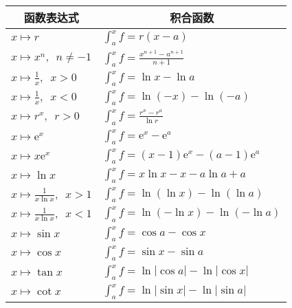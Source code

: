 \documentclass[12pt,UTF8]{ctexbook}
\begin{document}
\begin{appendix}
\begin{center}
    \renewcommand{\arraystretch}{2}
    \setlength{\extrarowheight}{-3pt}
    \begin{longtable}{|l|l|}
        \hline \multicolumn{1}{|c|}{\textbf{函数表达式}} & \multicolumn{1}{c|}{\textbf{积合函数}} \\[4pt] 
        \hline    
        $\displaystyle x\mapsto r$ & $\displaystyle \int_a^x f = r(x - a)$ \\[4pt]
        \hline    
        $\displaystyle x\mapsto x^n,\,\,\,n\neq -1$ & $\displaystyle \int_a^x f = \frac{x^{n+1} - a^{n+1}}{n+1}$ \\[4pt]
        \hline    
        $\displaystyle x\mapsto \frac{1}{x}, \,\,\, x > 0$ & $\displaystyle \int_a^x f = \ln{x} - \ln{a}$ \\[4pt]
        \hline    
        $\displaystyle x\mapsto \frac{1}{x}, \,\,\, x < 0$ & $\displaystyle \int_a^x f = \ln{(-x)} - \ln{(-a)}$ \\[4pt]
        \hline
        $\displaystyle x\mapsto r^x,\,\,\, r>0$ & $\displaystyle \int_a^x f = \frac{r^x - r^a}{\ln{r}}$ \\[4pt]
        \hline
        $\displaystyle x\mapsto \mathrm{e}^x$ & $\displaystyle \int_a^x f = \mathrm{e}^x - \mathrm{e}^a$ \\[4pt]
        \hline    
        $\displaystyle x\mapsto x\mathrm{e}^x$ & $\displaystyle \int_a^x f = (x - 1)\mathrm{e}^x - (a - 1)\mathrm{e}^a$ \\[4pt]
        \hline
        $\displaystyle x\mapsto \ln{x}$ & $\displaystyle \int_a^x f = x\ln{x} - x - a\ln{a} + a$ \\[4pt]
        \hline
        $\displaystyle x\mapsto \frac{1}{x\ln{x}},\,\,\, x>1$ & $\displaystyle \int_a^x f = \ln{(\ln{x})} - \ln{(\ln{a})}$ \\[4pt]
        \hline
        $\displaystyle x\mapsto \frac{1}{x\ln{x}},\,\,\, x<1$ & $\displaystyle \int_a^x f = \ln{(-\ln{x})} - \ln{(-\ln{a})}$ \\[4pt]
        \hline    
        $\displaystyle x\mapsto \sin{x}$ & $\displaystyle \int_a^x f = \cos{a} - \cos{x}$ \\[4pt]
        \hline    
        $\displaystyle x\mapsto \cos{x}$ & $\displaystyle \int_a^x f = \sin{x} - \sin{a}$ \\[4pt]
        \hline    
        $\displaystyle x\mapsto \tan{x}$ & $\displaystyle \int_a^x f = \ln{|\cos{a}|} - \ln{|\cos{x}|}$ \\[4pt]
        \hline    
        $\displaystyle x\mapsto \cot{x}$ & $\displaystyle \int_a^x f = \ln{|\sin{x}|} - \ln{|\sin{a}|}$ \\[4pt]

\end{longtable}
\end{center}
\end{appendix}
\end{document}
